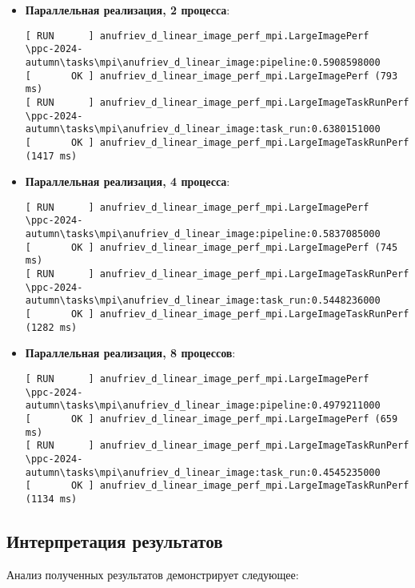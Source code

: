 \documentclass[12pt]{article}
\begin{document}
\begin{itemize}
    \item \textbf{Параллельная реализация, 2 процесса}:
    \begin{verbatim}
[ RUN      ] anufriev_d_linear_image_perf_mpi.LargeImagePerf
\ppc-2024-autumn\tasks\mpi\anufriev_d_linear_image:pipeline:0.5908598000
[       OK ] anufriev_d_linear_image_perf_mpi.LargeImagePerf (793 ms)
[ RUN      ] anufriev_d_linear_image_perf_mpi.LargeImageTaskRunPerf
\ppc-2024-autumn\tasks\mpi\anufriev_d_linear_image:task_run:0.6380151000
[       OK ] anufriev_d_linear_image_perf_mpi.LargeImageTaskRunPerf (1417 ms)
    \end{verbatim}
    
    \item \textbf{Параллельная реализация, 4 процесса}:
    \begin{verbatim}
[ RUN      ] anufriev_d_linear_image_perf_mpi.LargeImagePerf
\ppc-2024-autumn\tasks\mpi\anufriev_d_linear_image:pipeline:0.5837085000
[       OK ] anufriev_d_linear_image_perf_mpi.LargeImagePerf (745 ms)
[ RUN      ] anufriev_d_linear_image_perf_mpi.LargeImageTaskRunPerf
\ppc-2024-autumn\tasks\mpi\anufriev_d_linear_image:task_run:0.5448236000
[       OK ] anufriev_d_linear_image_perf_mpi.LargeImageTaskRunPerf (1282 ms)
    \end{verbatim}
    
    \item \textbf{Параллельная реализация, 8 процессов}:
    \begin{verbatim}
[ RUN      ] anufriev_d_linear_image_perf_mpi.LargeImagePerf
\ppc-2024-autumn\tasks\mpi\anufriev_d_linear_image:pipeline:0.4979211000
[       OK ] anufriev_d_linear_image_perf_mpi.LargeImagePerf (659 ms)
[ RUN      ] anufriev_d_linear_image_perf_mpi.LargeImageTaskRunPerf
\ppc-2024-autumn\tasks\mpi\anufriev_d_linear_image:task_run:0.4545235000
[       OK ] anufriev_d_linear_image_perf_mpi.LargeImageTaskRunPerf (1134 ms)
    \end{verbatim}
\end{itemize}

\subsection{Интерпретация результатов}
Анализ полученных результатов демонстрирует следующее:
\end{document}

